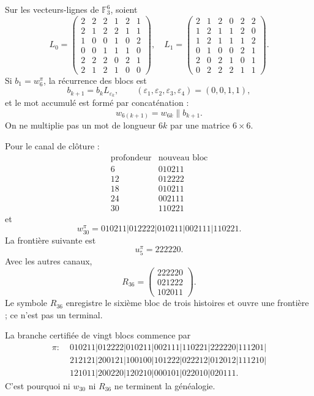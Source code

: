 Sur les vecteurs-lignes de \(\mathbb F_3^6\), soient
\[
L_0=
\begin{pmatrix}
2&2&2&1&2&1\\
2&1&2&2&1&1\\
1&0&0&1&0&2\\
0&0&1&1&1&0\\
2&2&2&0&2&1\\
2&1&2&1&0&0
\end{pmatrix},
\quad
L_1=
\begin{pmatrix}
2&1&2&0&2&2\\
1&2&1&1&2&0\\
1&2&1&1&1&2\\
0&1&0&0&2&1\\
2&0&2&1&0&1\\
0&2&2&2&1&1
\end{pmatrix}.
\]
Si \(b_1=w_6^\pi\), la récurrence des blocs est
\[
 b_{k+1}=b_kL_{\varepsilon_k},
 \qquad
 (\varepsilon_1,\varepsilon_2,\varepsilon_3,\varepsilon_4)=(0,0,1,1),
\]
et le mot accumulé est formé par concaténation :
\[
 w_{6(k+1)}=w_{6k}\mathbin{\|}b_{k+1}.
\]
On ne multiplie pas un mot de longueur \(6k\) par une matrice \(6\times6\).

Pour le canal de clôture :
\[
\begin{array}{c|c}
\text{profondeur}&\text{nouveau bloc}\\ \hline
6&010211\\
12&012222\\
18&010211\\
24&002111\\
30&110221
\end{array}
\]
et
\begin{equation}
 \boxed{
 w_{30}^{\pi}
 =010211|012222|010211|002111|110221.}
 \label{p12-83-c8-s1:eq:w30-pi-autonomo}
\end{equation}
La frontière suivante est
\[
 u_5^\pi=222220.
\]
Avec les autres canaux,
\[
 R_{36}=
 \begin{pmatrix}
 222220\\021222\\102011
 \end{pmatrix}.
\]
Le symbole \(R_{36}\) enregistre le sixième bloc de trois histoires et ouvre une
frontière ; ce n’est pas un terminal.

La branche certifiée de vingt blocs commence par
\begin{align*}
\pi:\;&010211|012222|010211|002111|110221|222220|111201|\\
&212121|200121|100100|101222|022212|012012|111210|\\
&121011|200220|120210|000101|022010|020111.
\end{align*}
C’est pourquoi ni \(w_{30}\) ni \(R_{36}\) ne terminent la généalogie.

